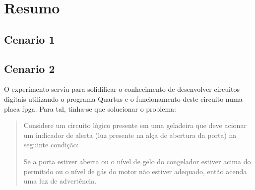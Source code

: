 \chapter{Resumo}
\section{Cenario 1}


\section{Cenario 2}
	O experimento serviu para solidificar o conhecimento de desenvolver circuitos digitais utilizando o
	programa Quartus e o funcionamento deste circuito numa placa \ac{fpga}. Para tal, tinha-se que solucionar
	o problema:
	\begin{quote}
		Considere um circuito lógico presente em uma geladeira que deve acionar um
		indicador de alerta (luz presente na alça de abertura da porta) na seguinte condição:

		Se a porta estiver aberta ou o nível de gelo do congelador estiver acima do permitido ou o
		nível de gás do motor não estiver adequado, então acenda uma luz de advertência.
	\end{quote}


